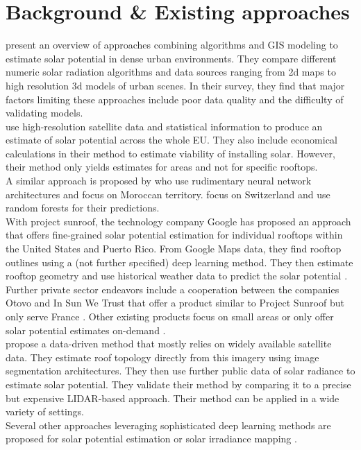 \documentclass{article} %
\begin{document}
\section*{Background \& Existing approaches}
\citet{freitas2015modelling} present an overview of approaches combining algorithms and GIS modeling to estimate solar potential in dense urban environments. They compare different numeric solar radiation algorithms and data sources ranging from 2d maps to high resolution 3d models of urban scenes. In their survey, they find that major factors limiting these approaches include poor data quality and the difficulty of validating models.\\
\cite{bodis2019high} use high-resolution satellite data and statistical information to produce an estimate of solar potential across the whole EU. They also include economical calculations in their method to estimate viability of installing solar. However, their method only yields estimates for areas and not for specific rooftops.\\
A similar approach is proposed by \citet{ouammi2012artificial} who use rudimentary neural network architectures and focus on Moroccan territory. \citet{assouline2018large} focus on Switzerland and use random forests for their predictions.\\
With project sunroof, the technology company Google has proposed an approach that offers fine-grained solar potential estimation for individual rooftops within the United States and Puerto Rico. From Google Maps data, they find rooftop outlines using a (not further specified) deep learning method. They then estimate rooftop geometry and use historical weather data to predict the solar potential \cite{sunroof}.\\
Further private sector endeavors include a cooperation between the companies Otovo and In Sun We Trust that offer a product similar to Project Sunroof but only serve France \cite{insun}. Other existing products focus on small areas or only offer solar potential estimates on-demand \cite{insun, rhino}.\\
\citet{lee2019deeproof} propose a data-driven method that mostly relies on widely available satellite data. They estimate roof topology directly from this imagery using image segmentation architectures. They then use further public data of solar radiance to estimate solar potential. They validate their method by comparing it to a precise but expensive LIDAR-based approach. Their method can be applied in a wide variety of settings.\\
Several other approaches leveraging sophisticated deep learning methods are proposed for solar potential estimation \cite{huang2019urban, zhong2021city} or solar irradiance mapping \cite{kumari2021deep, chandola2020multi, bamisile2020application}.
\end{document}
